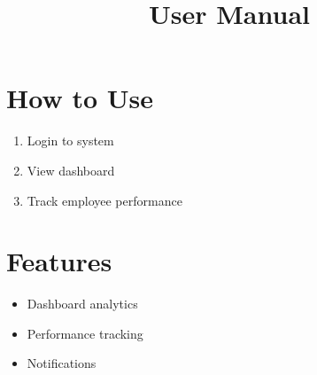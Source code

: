 \documentclass[12pt]{article}
\title{User Manual}
\date{}
\begin{document}
\maketitle

\section{How to Use}
\begin{enumerate}
    \item Login to system
    \item View dashboard
    \item Track employee performance
\end{enumerate}

\section{Features}
\begin{itemize}
    \item Dashboard analytics
    \item Performance tracking
    \item Notifications
\end{itemize}
\end{document}
